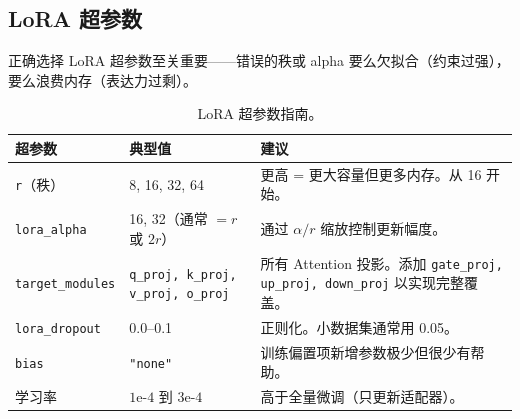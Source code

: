 \subsection{LoRA 超参数}
\label{lora-hyperparameters}

正确选择 LoRA 超参数至关重要——错误的秩或 alpha 要么欠拟合（约束过强），要么浪费内存（表达力过剩）。

\begin{table}[ht!]
\centering\small
\caption{LoRA 超参数指南。}
\noindent\begin{tabularx}{\linewidth}{@{}l Z{0.65} Z{1.35}@{}}
\toprule
\textbf{超参数} & \textbf{典型值} & \textbf{建议} \\
\midrule
\texttt{r}（秩） & 8, 16, 32, 64 & 更高 = 更大容量但更多内存。从 16 开始。 \\
\texttt{lora\_alpha} & 16, 32（通常 $= r$ 或 $2r$） & 通过 $\alpha/r$ 缩放控制更新幅度。 \\
\texttt{target\_modules} & \texttt{q\_proj, k\_proj, v\_proj, o\_proj} & 所有 Attention 投影。添加 \texttt{gate\_proj, up\_proj, down\_proj} 以实现完整覆盖。 \\
\texttt{lora\_dropout} & 0.0--0.1 & 正则化。小数据集通常用 0.05。 \\
\texttt{bias} & \texttt{"none"} & 训练偏置项新增参数极少但很少有帮助。 \\
学习率 & $1\text{e-}4$ 到 $3\text{e-}4$ & 高于全量微调（只更新适配器）。 \\
\bottomrule
\end{tabularx}
\end{table}

